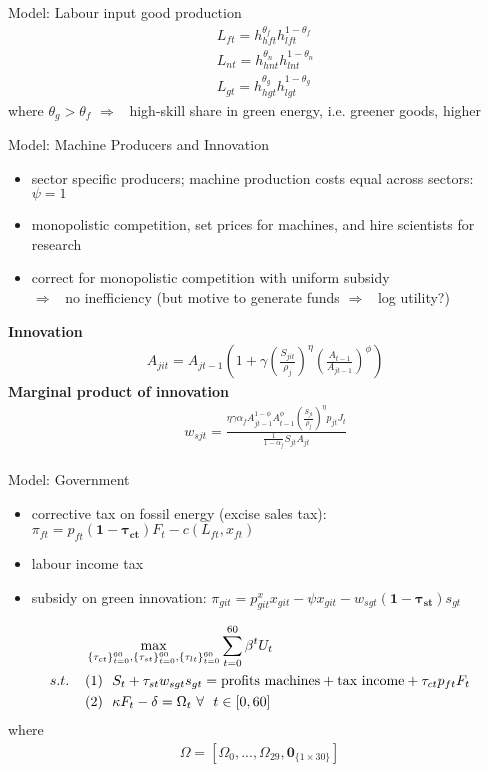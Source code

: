 \documentclass[11pt,aspectratio=169]{beamer}
\newcommand{\ar}{$\Rightarrow$ \ }
\begin{document}
\begin{frame}{Model: Labour input good production}
\begin{align*}& L_{ft}=h_{hft}^{\theta_{f}}h_{lft}^{1-\theta_{f}}\\
& L_{nt}=h_{hnt}^{\theta_{n}}h_{lnt}^{1-\theta_{n}}\\
& L_{gt}=h_{hgt}^{\theta_{g}}h_{lgt}^{1-\theta_{g}}
\end{align*}
where $\theta_{g}>\theta_{f}$ \ar high-skill share in green energy, i.e. greener goods, higher
\end{frame}
\begin{frame}{Model: Machine Producers and Innovation}
	\begin{itemize}
		\item sector specific producers; machine production costs equal across sectors: $\psi=1$
		\item monopolistic competition, set prices for machines, and hire scientists for research
		\item correct for monopolistic competition with uniform subsidy 
		\\ \ar no inefficiency (but motive to generate funds \ar log utility?)
	\end{itemize}
\pause
\textbf{Innovation}
\begin{align*}
&A_{jit}=A_{jt-1}\left(1+\gamma\left(\frac{S_{jit}}{\rho_j}\right)^{\eta}\left(\frac{A_{t-1}}{A_{jt-1}}\right)^{\phi}\right) 
\end{align*}
\pause
\textbf{Marginal product of innovation}
\begin{align*}
&
w_{sjt}=\frac{\eta \gamma \alpha_f A_{jt-1}^{1-\phi}A_{t-1}^{\phi}\left(\frac{S_{jt}}{\rho_j}\right)^{\eta}p_{jt}J_t}{\frac{1}{1-\alpha_f}S_{jt}A_{jt}}\\
\end{align*}
\end{frame}
\begin{frame}{Model: Government}
	\begin{itemize}
		\item corrective tax on fossil energy (excise sales tax): $\pi_{ft}=p_{ft}\pmb{(1-\tau_{ct})}F_t-c(L_{ft}, x_{ft})$
		\item labour income tax
		\item subsidy on green innovation: $\pi_{git}=p_{git}^x x_{git}-\psi x_{git}-w_{sgt}\pmb{(1-\tau_{st})}s_{gt}$
	\end{itemize}
\begin{align*}
&\max_{\{\tau_{ct}\}_{t=0}^{60}, \{\tau_{st}\}_{t=0}^{60}, \{\tau_{lt}\}_{t=0}^{60}} \sum_{t=0}^{60}\beta^t U_{t}\\
s.t. \hspace{4mm}
&(1)\ \ S_t+\tau_{st}w_{sgt}s_{gt}= \text{profits machines}+\text{tax income}+\tau_{ct}p_{ft}F_{t}\\
&
(2)\ \ \kappa F_t-\delta =\Omega_t\  \forall\ \  t\in[0,60]
\end{align*}
where 
\begin{align*}
\Omega =\left[\Omega_0,..., \Omega_{29}, \pmb{0}_{\{1\times 30\}}\right]
\end{align*}
\end{frame}
\end{document}
